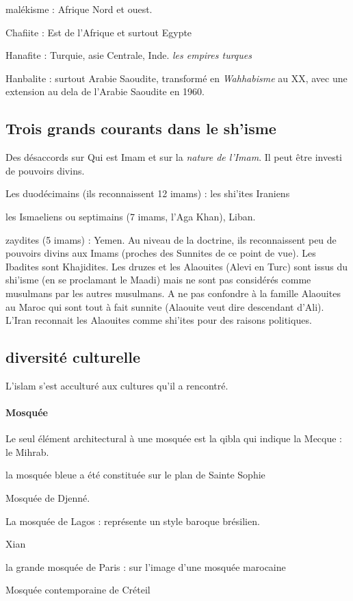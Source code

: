\bi 
\item  malékisme : Afrique Nord et ouest.
\item Chafiite : Est de l'Afrique et surtout Egypte 
\item Hanafite : Turquie, asie Centrale, Inde. \textit{les empires turques}
\item Hanbalite : surtout Arabie Saoudite, transformé en \textit{Wahhabisme} au XX, avec une extension au dela de l'Arabie Saoudite en 1960.
\ei 


\subsection{Trois grands courants dans le sh'isme}


\begin{Synthesis}
Des désaccords sur Qui est Imam et sur la \textit{nature de l'Imam}. Il peut être investi de pouvoirs divins.
\end{Synthesis}

\bi 
\item Les duodécimains (ils reconnaissent 12 imams) : les shi'ites Iraniens
\item les Ismaeliens ou septimains (7 imams, l'Aga Khan), Liban.
\item zaydites (5 imams) : Yemen. Au niveau de la doctrine, ils reconnaissent peu de pouvoirs divins aux Imams (proches des Sunnites de ce point de vue).
\ei 
Les Ibadites sont Khajidites. Les druzes et les Alaouites (Alevi en Turc) sont issus du shi'isme (en se proclamant le Maadi) mais ne sont pas considérés comme musulmans par les autres musulmans.  A ne pas confondre à la famille Alaouites au Maroc qui sont tout à fait sunnite (Alaouite veut dire descendant d'Ali). L'Iran reconnait les Alaouites comme shi'ites pour des raisons politiques. 

\subsection{diversité culturelle}
L'islam s'est acculturé aux cultures qu'il a rencontré.
\paragraph{Mosquée}
Le seul élément architectural à une mosquée est la qibla qui indique la Mecque : le Mihrab.

\bi
\item la mosquée bleue a été constituée sur le plan de Sainte Sophie
\item Mosquée de Djenné.
\item La mosquée de Lagos : représente un style baroque brésilien.
\item Xian
\item la grande mosquée de Paris : sur l'image d'une mosquée marocaine
\item Mosquée contemporaine de Créteil

